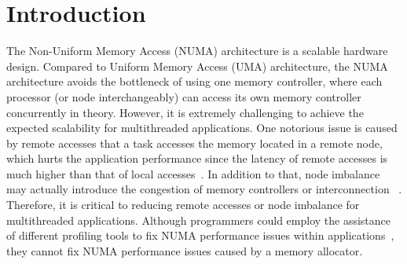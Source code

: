 



\section{Introduction}
\label{sec:intro}

The Non-Uniform Memory Access (NUMA) architecture is a scalable hardware design. Compared to Uniform Memory Access (UMA) architecture, the NUMA architecture avoids the bottleneck of using one memory controller, where each processor (or node interchangeably) can access its own memory controller concurrently in theory. However, it is extremely challenging to achieve the expected scalability for multithreaded applications. One notorious issue is caused by remote accesses that a task accesses the memory located in a remote node, which hurts the application performance since the latency of remote accesses is much higher than that of local accesses~\cite{Blagodurov:2011:CNC:2002181.2002182}. In addition to that, node imbalance may actually introduce the congestion of memory controllers or interconnection ~\cite{Blagodurov:2011:CNC:2002181.2002182}. Therefore, it is critical to reducing remote accesses or node imbalance for multithreaded applications. Although programmers could employ the assistance of different profiling tools to fix NUMA performance issues within applications~\cite{Intel:VTune, Memphis, Lachaize:2012:MMP:2342821.2342826, XuNuma, NumaMMA, 7847070, NumaPerf}, they cannot fix NUMA performance issues caused by a memory allocator.


